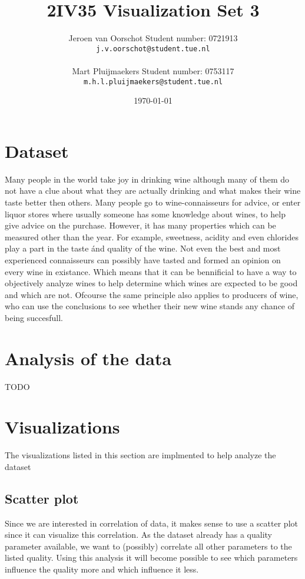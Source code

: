 \documentclass[a4paper,twoside,11pt]{article}
\title{\vspace{-\baselineskip}\sffamily\bfseries 2IV35 Visualization Set 3}
\author{Jeroen van Oorschot \qquad Student number: 0721913 \\{\tt j.v.oorschot@student.tue.nl}\\ \\Mart Pluijmaekers \qquad Student number: 0753117 \\{\tt m.h.l.pluijmaekers@student.tue.nl}}
\date{\today}
\begin{document}
\maketitle

\pagebreak
\tableofcontents
\newpage
\section{Dataset}
Many people in the world take joy in drinking wine although many of them do not have a clue about what they are actually drinking and what makes their wine taste better then others. Many people go to wine-connaisseurs for advice, or enter liquor stores where usually someone has some knowledge about wines, to help give advice on the purchase. However, it has many properties which can be measured other than the year. For example, sweetness, acidity and even chlorides play a part in the taste \'and quality of the wine. Not even the best and most experienced connaisseurs can possibly have tasted and formed an opinion on every wine in existance. Which means that it can be bennificial to have a way to objectively analyze wines to help determine which wines are expected to be good and which are not. Ofcourse the same principle also applies to producers of wine, who can use the conclusions to see whether their new wine stands any chance of being succesfull.

\section{Analysis of the data}
TODO


\section{Visualizations}
The visualizations listed in this section are implmented to help analyze the dataset

\subsection{Scatter plot}
Since we are interested in correlation of data, it makes sense to use a scatter plot since it can visualize this correlation. As the dataset already has a quality parameter available, we want to (possibly) correlate all other parameters to the listed quality. Using this analysis it will become possible to see which parameters influence the quality more and which influence it less. \\
\end{document}
